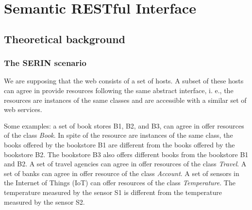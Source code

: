 \documentclass{singlecol-new}
\theoremstyle{TH}{
\newtheorem{lemma}{Lemma}
\newtheorem{theorem}[lemma]{Theorem}
\newtheorem{corrolary}[lemma]{Corrolary}
\newtheorem{conjecture}[lemma]{Conjecture}
\newtheorem{proposition}[lemma]{Proposition}
\newtheorem{claim}[lemma]{Claim}
\newtheorem{stheorem}[lemma]{Wrong Theorem}
\newtheorem{algorithm}{Algorithm}
}
\theoremstyle{THrm}{
\newtheorem{definition}{Definition}[section]
\newtheorem{question}{Question}[section]
\newtheorem{remark}{Remark}
\newtheorem{scheme}{Scheme}
}
\theoremstyle{THhit}{
\newtheorem{case}{Case}[section]
}
\begin{document}
\section{Semantic RESTful Interface}
\label{sec:serin}

\subsection{Theoretical background}
\label{sec:serin-theory}

\subsubsection{The SERIN scenario} 
\label{sec:serinscenario}
We are supposing that the web consists of a set of hosts. A subset of these hosts can agree 
in provide resources following the same abstract interface, i. e., the resources are instances of the same classes and are accessible with a similar set of web services.

Some examples: a set of book stores B1, B2, and B3, can agree in offer resources of the class \textit{Book}. 
In spite of the resource are instances of the same class, the books offered by the bookstore B1 are different from the books offered by the bookstore B2. 
The bookstore B3 also offers different books from the bookstore B1 and B2. 
A set of travel agencies can agree in offer resources of the class \textit{Travel}. 
A set of banks can agree in offer resource of the class \textit{Account}. 
A set of sensors in the Internet of Things (IoT) can offer resources of the class \textit{Temperature}. 
The temperature measured by the sensor S1 is different from the temperature measured by the sensor S2. 
\end{document}
